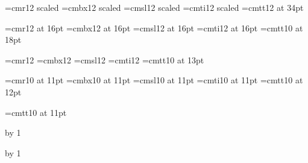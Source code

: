 
\newcount\sectionno{}
\newcount\subsectionno{}
\newcount\subsubsectionno{}
\newcount\subsubsubsectionno{}
\newcount\topicno{}

\font\titlerm=cmr12  scaled   \font\titlebf=cmbx12 scaled 
\font\titlesl=cmsl12 scaled   \font\titleit=cmti12 scaled 
\font\titlett=cmtt12 at 34pt

\font\sectionrm=cmr12  at 16pt         \font\sectionbf=cmbx12 at 16pt
\font\sectionsl=cmsl12 at 16pt         \font\sectionit=cmti12 at 16pt
\font\sectiontt=cmtt10 at 18pt

\font\subsectionrm=cmr12               \font\subsectionbf=cmbx12
\font\subsectionsl=cmsl12              \font\subsectionit=cmti12
\font\subsectiontt=cmtt10 at 13pt

\font\topicrm=cmr10 at 11pt            \font\topicbf=cmbx10 at 11pt
\font\topicsl=cmsl10 at 11pt           \font\topicit=cmti10 at 11pt
\font\topictt=cmtt10 at 12pt

\font\bodytt=cmtt10 at 11pt
\def\tt{\fam\ttfam\bodytt}

\def\title#1\par{{
    \let\rm\titlerm\let\bf\titlebf
    \let\tt\titlett\let\it\titleit
    \let\sl\titlesl\rm
    {}}\bigskip}

\def\section#1\par{
    \advance\sectionno by 1
    \vsize{}
    \vsize{}
    \bigskip
    {\let\rm\sectionrm\let\bf\sectionbf
    \let\tt\sectiontt\let\it\sectionit
    \let\sl\sectionsl
    \rm{}}
    \nobreak\smallskip\noindent}

\def\subsection#1\par{
    \advance\subsectionno by 1
    \vsize{}
    \vsize{}
    \bigskip
    {\let\rm\subsectionrm\let\bf\subsectionbf
    \let\tt\subsectiontt\let\it\subsectionit
    \let\sl\subsectionsl
    \rm{}}
    \nobreak\smallskip\noindent}

